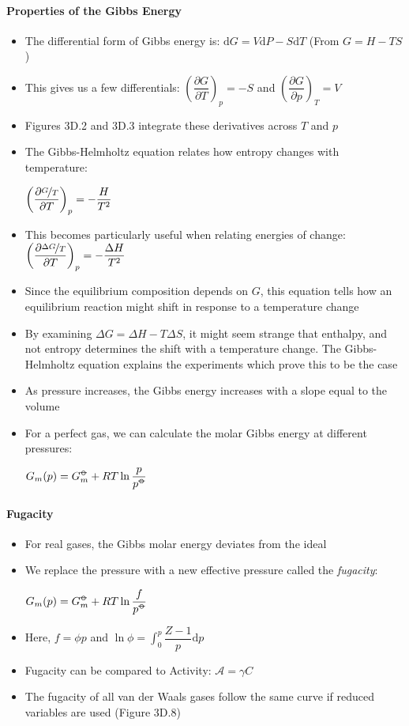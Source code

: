 \documentclass[12pt, openany, letterpaper]{memoir}
\begin{document}
\paragraph{Properties of the Gibbs Energy}
\begin{itemize}
	\item The differential form of Gibbs energy is: $\mathrm{d}G = V\mathrm{d}P-S\mathrm{d}T$ (From $G=H-TS$)
	\item This gives us a few differentials: $\left(\dfrac{\partial G}{\partial T}\right)_p = -S$ and $\left(\dfrac{\partial G}{\partial p}\right)_T = V$
	\item Figures 3D.2 and 3D.3 integrate these derivatives across $T$ and $p$
	\item The Gibbs-Helmholtz equation relates how entropy changes with temperature:

	      $\left(\dfrac{\partial \nicefrac{G}{T}}{\partial T}\right)_p = -\dfrac{H}{T^2}$
	\item This becomes particularly useful when relating energies of change: $\left(\dfrac{\partial \nicefrac{\Delta G}{T}}{\partial T}\right)_p = -\dfrac{\Delta H}{T^2}$
	\item Since the equilibrium composition depends on $G$, this equation tells how an equilibrium reaction might shift in response to a temperature change
	\item By examining $\Delta G = \Delta H - T\Delta S$, it might seem strange that enthalpy, and not entropy determines the shift with a temperature change. The Gibbs-Helmholtz equation explains the experiments which prove this to be the case
	\item As pressure increases, the Gibbs energy increases with a slope equal to the volume
	\item For a perfect gas, we can calculate the molar Gibbs energy at different pressures:

	      $G_m(p)=G_m^{\std}+RT\ln\dfrac{p}{p^{\std}}$
\end{itemize}
\paragraph{Fugacity}
\begin{itemize}
	\item For real gases, the Gibbs molar energy deviates from the ideal
	\item We replace the pressure with a new effective pressure called the \emph{fugacity}:

	      $G_m(p)=G_m^{\std}+RT\ln\dfrac{f}{p^{\std}}$
	\item Here, $f = \phi p$ and $\ln\phi = \displaystyle\int_0^p \dfrac{Z-1}{p}\mathrm{d}p$
	\item Fugacity can be compared to Activity: $\mathcal{A} = \gamma C$
	\item The fugacity of all van der Waals gases follow the same curve if reduced variables are used (Figure 3D.8)
\end{itemize}
\end{document}
